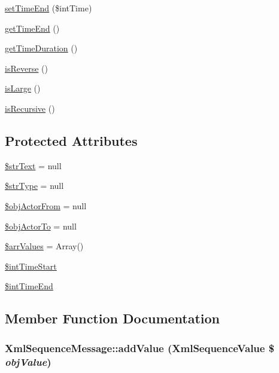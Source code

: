 \begin{CompactItemize}
\hyperlink{class_xml_sequence_message_7fddd3ce13210832ec0ec73a751c332c}{setTimeEnd} (\$intTime)
\item 
\hyperlink{class_xml_sequence_message_a0c32ce53d9ecdff7099c221126fb58c}{getTimeEnd} ()
\item 
\hyperlink{class_xml_sequence_message_0f7538c36a98475fcd35cd554e7c7d05}{getTimeDuration} ()
\item 
\hyperlink{class_xml_sequence_message_c73e3d276fb5b60bfac84c7bda29cb1e}{isReverse} ()
\item 
\hyperlink{class_xml_sequence_message_c2fdfe0fd692c08d72faf1ca63fb7263}{isLarge} ()
\item 
\hyperlink{class_xml_sequence_message_50dd7454dfc6418b76613e6518a1fcc1}{isRecursive} ()
\end{CompactItemize}
\subsection*{Protected Attributes}
\begin{CompactItemize}
\item 
\hyperlink{class_xml_sequence_message_5191806ce342246e9febbb7188ef914f}{\$strText} = null
\item 
\hyperlink{class_xml_sequence_message_9cbf41c891bfaaacc0048ec4e7f54765}{\$strType} = null
\item 
\hyperlink{class_xml_sequence_message_677eb4ecb7493d72f3ea96d6b896f5c4}{\$objActorFrom} = null
\item 
\hyperlink{class_xml_sequence_message_6e35efb1112d87db5a90f660f2c7e487}{\$objActorTo} = null
\item 
\hyperlink{class_xml_sequence_message_97999a3267c23300fddf5d7e0ff0e87d}{\$arrValues} = Array()
\item 
\hyperlink{class_xml_sequence_message_3e60774808cf2fd2fe04898ca6314184}{\$intTimeStart}
\item 
\hyperlink{class_xml_sequence_message_5c82454b9be08a7fc94fd580932f59c1}{\$intTimeEnd}
\end{CompactItemize}


\subsection{Member Function Documentation}
\hypertarget{class_xml_sequence_message_fc28193031e8ccdedf401767f7881267}{
\subsubsection[{addValue}]{\setlength{\rightskip}{0pt plus 5cm}XmlSequenceMessage::addValue ({\bf XmlSequenceValue} \$ {\em objValue})}}
\label{class_xml_sequence_message_fc28193031e8ccdedf401767f7881267}


